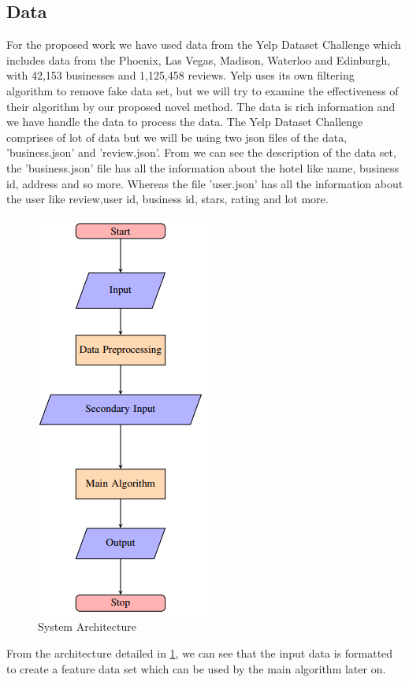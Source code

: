 \documentclass[sigconf]{acmart}
\begin{document}
\subsection{Data}
For the proposed work we have used data from the Yelp Dataset Challenge which includes data from the Phoenix, Las Vegas, Madison, Waterloo and Edinburgh, with 42,153 businesses and 1,125,458 reviews. Yelp uses its own filtering algorithm to remove fake data set, but we will try to examine the effectiveness of their algorithm by our proposed novel method. The data is rich information and we have handle the data to process the data. The Yelp Dataset Challenge comprises of lot of data but we will be using two json files of the data, 'business.json' and 'review.json'.  From \cite{yelpdatasetchalleng} we can see the description of the data set, the 'business.json' file has all the information about the hotel like name, business id, address and so more. Whereas the file 'user.json' has all the information about the user like review,user id, business id, stars, rating and lot more.
\begin{figure}
  \centering\includegraphics[width=\columnwidth,height=\linewidth]{project/images/Capture.png}
  \caption{System Architecture}\label{f:archi}
\end{figure}

From the architecture detailed in \ref{f:archi}, we can see that the input data is formatted to create a feature data set which can be used by the main algorithm later on.
\end{document}
